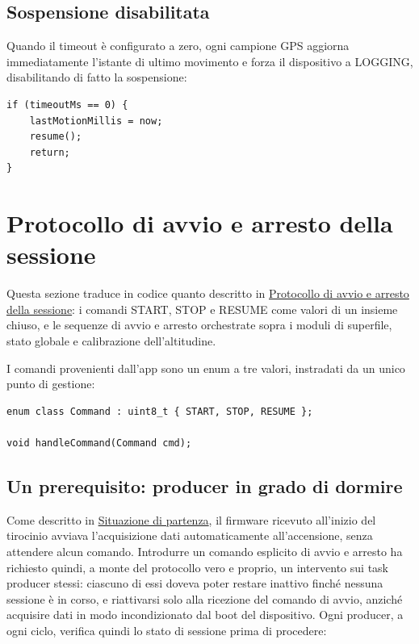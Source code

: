 \subsection{Sospensione disabilitata}
Quando il timeout è configurato a zero, ogni campione GPS aggiorna
immediatamente l'istante di ultimo movimento e forza il dispositivo a
LOGGING, disabilitando di fatto la sospensione:

\begin{listing}[H]
\begin{verbatim}
if (timeoutMs == 0) {
    lastMotionMillis = now;
    resume();
    return;
}
\end{verbatim}
\caption{Disattivazione della sospensione tramite timeout a zero}
\label{listing:inactivity-never}
\end{listing}

\newpage


\section{Protocollo di avvio e arresto della sessione}

Questa sezione traduce in codice quanto descritto in
\hyperref[sec:avvio-arresto]{Protocollo di avvio e arresto della sessione}: i
comandi START, STOP e RESUME come valori di un insieme chiuso, e le sequenze
di avvio e arresto orchestrate sopra i moduli di superfile, stato
globale e calibrazione dell'altitudine.

I comandi provenienti dall'app sono un enum a tre valori, instradati da un
unico punto di gestione:

\begin{listing}[H]
\begin{verbatim}
enum class Command : uint8_t { START, STOP, RESUME };

void handleCommand(Command cmd);
\end{verbatim}
\caption{Interfaccia del modulo sessione}
\label{listing:session-command}
\end{listing}

\subsection{Un prerequisito: producer in grado di dormire}
Come descritto in \hyperref[sec:situazione-partenza]{Situazione di partenza},
il firmware ricevuto all'inizio del tirocinio avviava l'acquisizione dati
automaticamente all'accensione, senza attendere alcun comando. Introdurre un
comando esplicito di avvio e arresto ha richiesto quindi, a monte del
protocollo vero e proprio, un intervento sui task producer stessi: ciascuno
di essi doveva poter restare inattivo finché nessuna sessione è in corso, e
riattivarsi solo alla ricezione del comando di avvio, anziché acquisire dati
in modo incondizionato dal boot del dispositivo. Ogni producer, a ogni ciclo,
verifica quindi lo stato di sessione prima di procedere:

